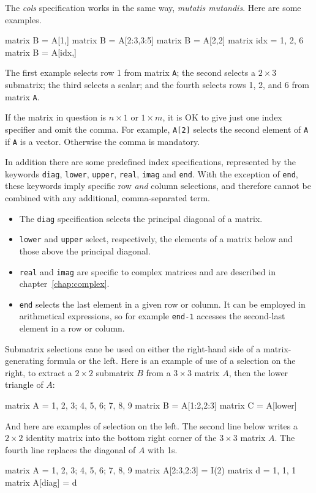 The \textsl{cols} specification works in the same way, \textit{mutatis
  mutandis}.  Here are some examples.
%
\begin{code}
matrix B = A[1,]
matrix B = A[2:3,3:5]
matrix B = A[2,2]
matrix idx = {1, 2, 6}
matrix B = A[idx,]
\end{code}
%
The first example selects row 1 from matrix \texttt{A}; the second
selects a $2\times 3$ submatrix; the third selects a scalar; and
the fourth selects rows 1, 2, and 6 from matrix \texttt{A}.

If the matrix in question is $n\times 1$ or $1\times m$, it is
OK to give just one index specifier and omit the comma. For example,
\texttt{A[2]} selects the second element of \texttt{A} if \texttt{A}
is a vector. Otherwise the comma is mandatory.

In addition there are some predefined index specifications,
represented by the keywords \texttt{diag}, \texttt{lower},
\texttt{upper}, \texttt{real}, \texttt{imag} and \texttt{end}. With
the exception of \texttt{end}, these keywords imply specific row
\textit{and} column selections, and therefore cannot be combined with
any additional, comma-separated term.

\begin{itemize}
\item The \texttt{diag} specification selects the principal diagonal
  of a matrix.
\item \texttt{lower} and \texttt{upper} select, respectively, the
  elements of a matrix below and those above the principal diagonal.
\item \texttt{real} and \texttt{imag} are specific to complex matrices
  and are described in chapter~\ref{chap:complex}.
\item \texttt{end} selects the last element in a given row or column.
  It can be employed in arithmetical expressions, so for example
  \texttt{end-1} accesses the second-last element in a row or column.
\end{itemize}

Submatrix selections cane be used on either the right-hand side of a
matrix-generating formula or the left.  Here is an example of use of a
selection on the right, to extract a $2\times 2$ submatrix $B$ from a
$3\times 3$ matrix $A$, then the lower triangle of $A$:
%
\begin{code}
matrix A = {1, 2, 3; 4, 5, 6; 7, 8, 9}
matrix B = A[1:2,2:3]
matrix C = A[lower]
\end{code}
%
And here are examples of selection on the left.  The second line below
writes a $2\times 2$ identity matrix into the bottom right corner of the
$3\times 3$ matrix $A$.  The fourth line replaces the diagonal of $A$ 
with 1s.
%
\begin{code}
matrix A = {1, 2, 3; 4, 5, 6; 7, 8, 9}
matrix A[2:3,2:3] = I(2)
matrix d = {1, 1, 1}
matrix A[diag] = d
\end{code}

